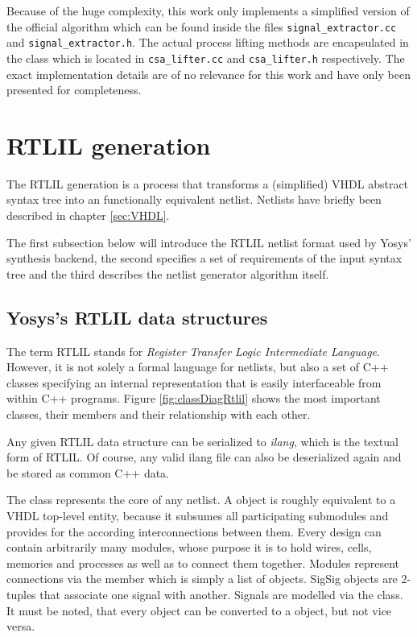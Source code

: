 Because of the huge complexity, this work only implements a simplified
version of the official algorithm which can be found inside the files
\texttt{signal_extractor.cc} and \texttt{signal_extractor.h}. The
actual process lifting methods are encapsulated in the class
 which is located in \texttt{csa_lifter.cc} and
\texttt{csa_lifter.h} respectively. The exact implementation details
are of no relevance for this work and have only been presented for
completeness.

\section{RTLIL generation}
\label{sec:RTLILgeneration}

The RTLIL generation is a process that transforms a (simplified) VHDL
abstract syntax tree into an functionally equivalent netlist. Netlists
have briefly been described in chapter \ref{sec:VHDL}.

The first subsection below will introduce the RTLIL netlist format
used by
Yosys' synthesis backend, the second specifies a set of requirements
of the input syntax tree and the third describes the netlist generator
algorithm itself.

\subsection{Yosys's RTLIL data structures}
\label{sec:rtlilStruct}

The term RTLIL stands for \emph{Register Transfer Logic Intermediate
Language}. However, it is not solely a formal language for netlists,
but also a set of C++ classes specifying an internal representation
that is easily interfaceable from within C++ programs. Figure
\ref{fig:classDiagRtlil} shows the most
important classes, their members and their relationship with each
other.

Any given RTLIL data structure can be serialized to \emph{ilang}, which
is the textual form of RTLIL. Of course, any valid ilang file can
also be deserialized again and be stored as common C++ data.

The class  represents the core of any netlist. A
 object is roughly equivalent to a VHDL top-level entity,
because it subsumes all participating submodules and provides for the
according interconnections between them. Every design can contain
arbitrarily many modules, whose purpose it is to hold wires, cells,
memories and processes as well as to connect them together. Modules
represent connections via the  member which is simply
a list of  objects. SigSig objects are 2-tuples that
associate one signal with another. Signals are modelled via the
 class. It must be noted, that every  object
can be converted to a  object, but not vice versa.

